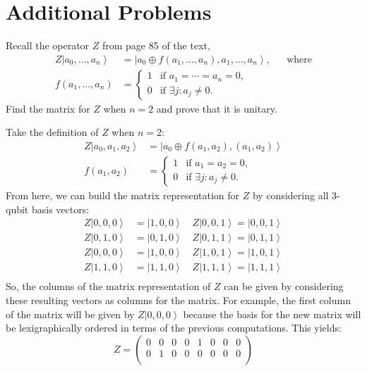 \documentclass{exam} %
\theoremstyle{plain}
\theoremstyle{definition}
\theoremstyle{remark}
\newcommand{\pmat}[1]{ \begin{pmatrix} #1 \end{pmatrix} }
\numberwithin{equation}{section}  %
\renewcommand{\ket}[1]{ \left| #1 \right> }
\begin{document}
\section{Additional Problems}
\begin{questions}
\question Recall the operator $Z$ from page 85 of the text,
\begin{align*}
  Z\ket{a_0,\dots, a_n} 
    &= \ket{a_0\oplus f(a_1,\dots,a_n), a_1,\dots, a_n}, && \text{where} \\
  f(a_1,\dots,a_n)
    &= \begin{cases}
      1 & \text{if } a_1 = \cdots = a_n = 0, \\
      0 & \text{if } \exists j : a_j\neq 0.
    \end{cases}
\end{align*}
Find the matrix for $Z$ when $n = 2$ and prove that it is unitary.
\begin{solution}
  Take the definition of $Z$ when $n = 2$:
  \begin{align*}
    Z\ket{a_0, a_1, a_2} &= \ket{a_0\oplus f(a_1, a_2), (a_1, a_2)}\\
    f(a_1, a_2) 
    &= 
    \begin{cases}
      1 & \text{if } a_1 = a_2 = 0,\\
      0 & \text{if } \exists j:a_j \neq 0.
    \end{cases}
  \end{align*}
  From here, we can build the matrix representation for $Z$ by considering all
  3-qubit basis vectors:
  \begin{align*}
    Z\ket{0,0,0} &= \ket{1,0,0} \quad Z\ket{0,0,1} = \ket{0,0,1}\\
    Z\ket{0,1,0} &= \ket{0,1,0}\quad Z\ket{0,1,1} = \ket{0,1,1}\\
    Z\ket{0,0,0} &= \ket{1,0,0}\quad Z\ket{1,0,1} =\ket{1,0,1} \\
    Z\ket{1,1,0} &=\ket{1,1,0} \quad Z\ket{1,1,1} = \ket{1,1,1}\\
  \end{align*}
  So, the columns of the matrix representation of $Z$ can be given by considering
  these resulting vectors as columns for the matrix. For example, the first 
  column of the matrix will be given by $Z\ket{0,0,0}$ because the basis for the
  new matrix will be lexigraphically ordered in terms of the previous 
  computations. This yields:
  \[
    Z = \pmat{
      0&0&0&0&1&0&0&0\\
      0&1&0&0&0&0&0&0\\
}\]
\end{solution}
\end{questions}
\end{document}
